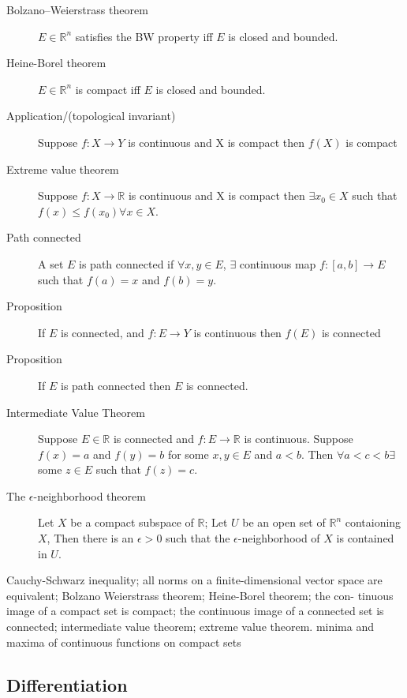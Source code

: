 \begin{description}
\item[Bolzano–Weierstrass theorem]
	$E \in \mathbb{R}^n$ satisfies the BW property iff $E$ is closed and bounded.

\item[Heine-Borel theorem] $E \in \mathbb{R}^n$ is compact iff $E$ is closed and bounded.
\item[Application/(topological invariant)] Suppose $f:X \to Y$ is continuous and X is compact then $f(X)$ is compact
\item[Extreme value theorem] Suppose $f:X \to \mathbb{R}$ is continuous and X is compact then $\exists x_0 \in X$
such that $f(x) \leq f(x_0) \forall x \in X$.
\item[Path connected] A set $E$ is path connected if $\forall x, y \in E$, $\exists$ continuous
map $f:[a, b] \to E$ such that $f(a) = x$ and $f(b) = y$.
\item[Proposition] If $E$ is connected, and $f:E \to Y$ is continuous then $f(E)$ is connected
\item[Proposition] If $E$ is path connected then $E$ is connected.
\item[Intermediate Value Theorem] Suppose $E \in \mathbb{R}$ is connected and $f: E \to \mathbb{R}$
is continuous. Suppose $f(x) = a$ and $f(y) = b$ for some $x, y \in E$ and $a < b$.
Then $\forall a < c < b \exists$ some $z \in E$ such that $f(z) = c$.
\item[The $\epsilon$-neighborhood theorem] Let $X$ be a compact subspace of $\mathbb{R}$; Let $U$ be an open set of $\mathbb{R}^n$
contaioning $X$, Then there is an $\epsilon > 0$ such that the $\epsilon$-neighborhood of $X$ is contained in $U$.
\end{description}

Cauchy-Schwarz inequality; all norms on a finite-dimensional vector
space are equivalent; Bolzano Weierstrass theorem; Heine-Borel theorem; the con-
tinuous image of a compact set is compact; the continuous image of a connected
set is connected; intermediate value theorem; extreme value theorem. minima and
maxima of continuous functions on compact sets
\subsection{Differentiation}



